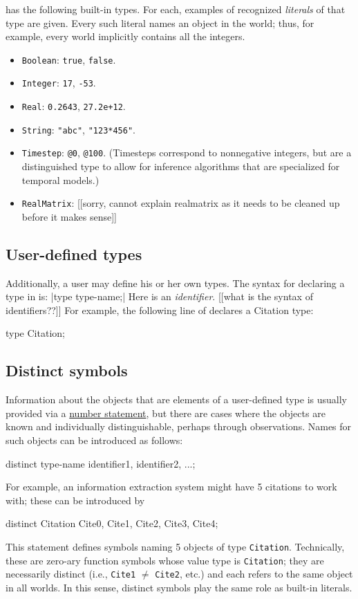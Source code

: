 \documentclass[12pt]{article}
\begin{document}
\bl has the following built-in types. For each, examples of recognized {\em literals} of that type are given.
Every such literal names an object in the world; thus, for example, every world implicitly contains all the integers.
\begin{itemize}
\item \verb|Boolean|: \verb|true|, \verb|false|.
\item \verb|Integer|: \verb|17|, \verb|-53|.
\item \verb|Real|: \verb|0.2643|, \verb|27.2e+12|.
\item \verb|String|: \verb|"abc"|, \verb|"123*456"|.
\item \verb|Timestep|: \verb|@0|, \verb|@100|. (Timesteps correspond to nonnegative integers, but are a distinguished type
to allow for inference algorithms that are specialized for temporal models.)
\item \verb|RealMatrix|: [[sorry, cannot explain realmatrix as it needs to be cleaned up before it makes sense]]
\end{itemize}


\subsection{User-defined types}\label{user-type-section}

Additionally, a user may define his or her own types.  The syntax for declaring a type in \bl is:
\blog|type type-name;|
Here  is an {\it identifier}. [[what is the syntax of identifiers??]]
For example, the following line of \bl declares a Citation type:
\begin{blogcode}
type Citation;
\end{blogcode}

\subsection{Distinct symbols}\label{distinct-section}
Information about the objects that are elements of a user-defined type
is usually provided via a \hyperref[number-section]{number statement}, but there are cases
where the objects are known and individually distinguishable, perhaps through observations.
Names for such objects can be introduced as follows:
\begin{blogcode}
distinct type-name identifier1, identifier2, ...;
\end{blogcode}
For example, an information extraction system might have 5 citations to work with;
these can be introduced by
\begin{blogcode}
distinct Citation Cite0, Cite1, Cite2, Cite3, Cite4;
\end{blogcode}
This statement defines symbols naming 5 objects of type {\tt Citation}.
Technically, these are zero-ary function symbols whose value type is {\tt Citation};
they are necessarily distinct  (i.e., {\tt Cite1} $\neq$ {\tt Cite2}, etc.)
and each refers to the same object in all worlds. In this sense,
distinct symbols play the same role as built-in literals.
\end{document}
